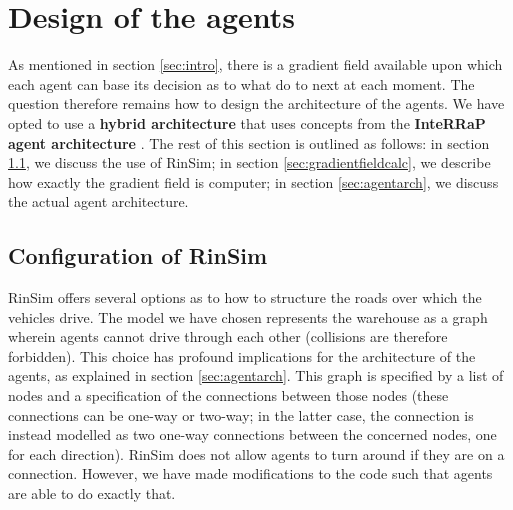 \section{Design of the agents}\label{sec:agentdesign}
As mentioned in section \ref{sec:intro}, there is a gradient field available upon which each agent can base its decision as to what do to next at each moment. The question therefore remains how to design the architecture of the agents. We have opted to use a \textbf{hybrid architecture} that uses concepts from the \textbf{InteRRaP agent architecture} \cite{muller2011agent}. The rest of this section is outlined as follows: in section \ref{sec:rinsimconf}, we discuss the use of RinSim; in section \ref{sec:gradientfieldcalc}, we describe how exactly the gradient field is computer; in section \ref{sec:agentarch}, we discuss the actual agent architecture.

\subsection{Configuration of RinSim}\label{sec:rinsimconf}
RinSim \cite{rinsim} offers several options as to how to structure the roads over which the vehicles drive. The model we have chosen represents the warehouse as a graph wherein agents cannot drive through each other (collisions are therefore forbidden). This choice has profound implications for the architecture of the agents, as explained in section \ref{sec:agentarch}. This graph is specified by a list of nodes and a specification of the connections between those nodes (these connections can be one-way or two-way; in the latter case, the connection is instead modelled as two one-way connections between the concerned nodes, one for each direction). RinSim does not allow agents to turn around if they are on a connection. However, we have made modifications to the code such that agents are able to do exactly that.

